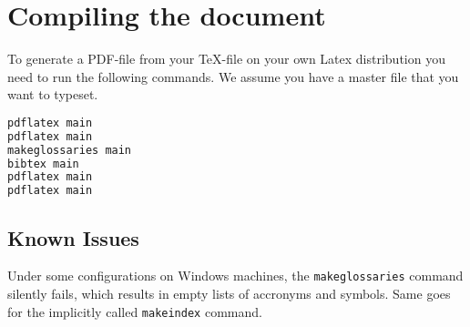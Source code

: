 \chapter{Compiling the document}
To generate a PDF-file from your \TeX-file on your own Latex distribution you need to run the following commands. We assume you have a master file  that you want to typeset.

\begin{lstlisting}[float=htp, caption={Commands to compile this document}, label={lst:compiling}, language=bash, morekeywords={pdflatex, bibtex, makeglossaries}]
pdflatex main
pdflatex main
makeglossaries main
bibtex main
pdflatex main
pdflatex main
\end{lstlisting}

\section{Known Issues}
Under some configurations on Windows machines, the \texttt{makeglossaries} command silently fails, which results in empty lists of accronyms and symbols. Same goes for the implicitly called \texttt{makeindex} command. 